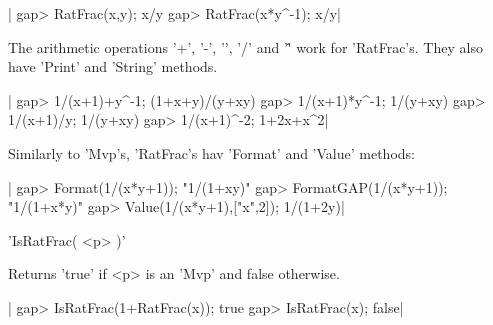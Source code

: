 |    gap> RatFrac(x,y);
    x/y
    gap> RatFrac(x*y^-1);
    x/y|


The arithmetic operations '+', '-', '\*',  '/' and '\^' work for 'RatFrac's.
They also  have 'Print' and  'String' methods.

|    gap> 1/(x+1)+y^-1;
    (1+x+y)/(y+xy)
    gap> 1/(x+1)*y^-1;
    1/(y+xy)
    gap> 1/(x+1)/y;   
    1/(y+xy)
    gap> 1/(x+1)^-2;
    1+2x+x^2|

Similarly to 'Mvp's, 'RatFrac's hav 'Format' and 'Value' methods:

|    gap> Format(1/(x*y+1));
    "1/(1+xy)"
    gap> FormatGAP(1/(x*y+1));
    "1/(1+x*y)"
    gap> Value(1/(x*y+1),["x",2]);
    1/(1+2y)|

%
%

'IsRatFrac( <p> )'

Returns 'true' if <p> is an 'Mvp' and false otherwise.

|    gap> IsRatFrac(1+RatFrac(x));
    true
    gap> IsRatFrac(x);         
    false|

